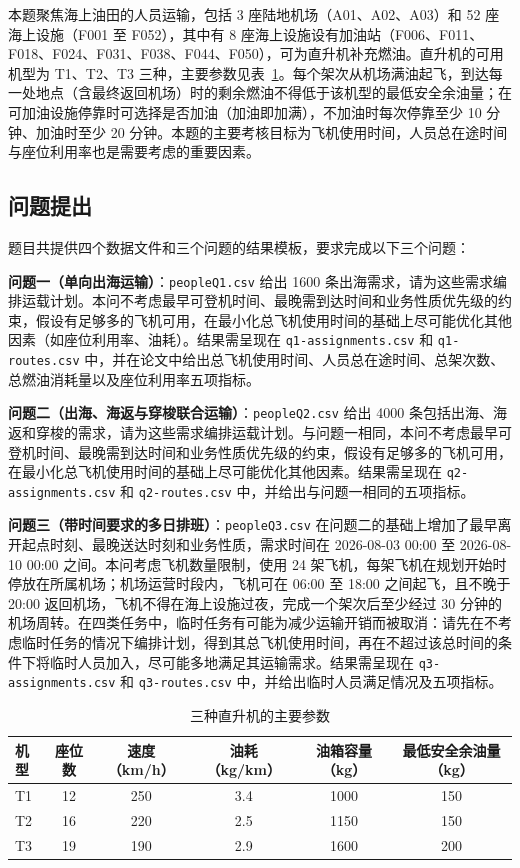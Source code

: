 \documentclass[UTF8,zihao=-4]{ctexart}
\numberwithin{figure}{section}
\numberwithin{table}{section}
\begin{document}
本题聚焦海上油田的人员运输，包括 3 座陆地机场（A01、A02、A03）和 52 座海上设施（F001 至 F052），其中有 8 座海上设施设有加油站（F006、F011、F018、F024、F031、F038、F044、F050），可为直升机补充燃油。直升机的可用机型为 T1、T2、T3 三种，主要参数见表~\ref{tab:aircraft}。每个架次从机场满油起飞，到达每一处地点（含最终返回机场）时的剩余燃油不得低于该机型的最低安全余油量；在可加油设施停靠时可选择是否加油（加油即加满），不加油时每次停靠至少 10 分钟、加油时至少 20 分钟。本题的主要考核目标为飞机使用时间，人员总在途时间与座位利用率也是需要考虑的重要因素。

\subsection{问题提出}

题目共提供四个数据文件和三个问题的结果模板，要求完成以下三个问题：

\textbf{问题一（单向出海运输）}：\texttt{peopleQ1.csv} 给出 1600 条出海需求，请为这些需求编排运载计划。本问不考虑最早可登机时间、最晚需到达时间和业务性质优先级的约束，假设有足够多的飞机可用，在最小化总飞机使用时间的基础上尽可能优化其他因素（如座位利用率、油耗）。结果需呈现在 \texttt{q1-assignments.csv} 和 \texttt{q1-routes.csv} 中，并在论文中给出总飞机使用时间、人员总在途时间、总架次数、总燃油消耗量以及座位利用率五项指标。

\textbf{问题二（出海、海返与穿梭联合运输）}：\texttt{peopleQ2.csv} 给出 4000 条包括出海、海返和穿梭的需求，请为这些需求编排运载计划。与问题一相同，本问不考虑最早可登机时间、最晚需到达时间和业务性质优先级的约束，假设有足够多的飞机可用，在最小化总飞机使用时间的基础上尽可能优化其他因素。结果需呈现在 \texttt{q2-assignments.csv} 和 \texttt{q2-routes.csv} 中，并给出与问题一相同的五项指标。

\textbf{问题三（带时间要求的多日排班）}：\texttt{peopleQ3.csv} 在问题二的基础上增加了最早离开起点时刻、最晚送达时刻和业务性质，需求时间在 2026-08-03 00:00 至 2026-08-10 00:00 之间。本问考虑飞机数量限制，使用 24 架飞机，每架飞机在规划开始时停放在所属机场；机场运营时段内，飞机可在 06:00 至 18:00 之间起飞，且不晚于 20:00 返回机场，飞机不得在海上设施过夜，完成一个架次后至少经过 30 分钟的机场周转。在四类任务中，临时任务有可能为减少运输开销而被取消：请先在不考虑临时任务的情况下编排计划，得到其总飞机使用时间，再在不超过该总时间的条件下将临时人员加入，尽可能多地满足其运输需求。结果需呈现在 \texttt{q3-assignments.csv} 和 \texttt{q3-routes.csv} 中，并给出临时人员满足情况及五项指标。

\begin{table}[H]
  \centering
  \caption{三种直升机的主要参数}
  \label{tab:aircraft}
  \begin{tabular}{lccccc}
    \toprule
    机型 & 座位数 & 速度（km/h） & 油耗（kg/km） & 油箱容量（kg） & 最低安全余油量（kg） \\
    \midrule
    T1 & 12 & 250 & 3.4 & 1000 & 150 \\
    T2 & 16 & 220 & 2.5 & 1150 & 150 \\
    T3 & 19 & 190 & 2.9 & 1600 & 200 \\
    \bottomrule
  \end{tabular}
\end{table}
\end{document}
